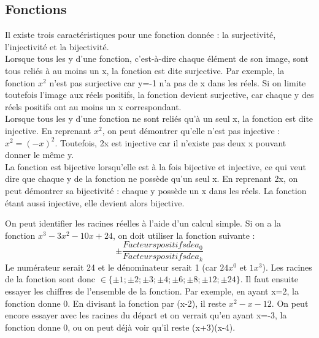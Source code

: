 \documentclass[10pt, french]{article}
\begin{document}
\begin{multicols*}{2}
\section{Fonctions}

\begin{definitionNOHFILL}
Il existe trois caractéristiques pour une fonction donnée : la surjectivité, l'injectivité et la bijectivité.\\

Lorsque tous les y d'une fonction, c'est-à-dire chaque élément de son image, sont tous reliés à au moins un x, la fonction est dite surjective. Par exemple, la fonction $x^{2}$ n'est pas surjective car y=-1 n'a pas de x dans les réels. Si on limite toutefois l'image aux réels positifs, la fonction devient surjective, car chaque y des réels positifs ont au moins un x correspondant.\\

Lorsque tous les y d'une fonction ne sont reliés qu'à un seul x, la fonction est dite injective. En reprenant $x^{2}$, on peut démontrer qu'elle n'est pas injective : $x^{2}=(-x)^{2}$. Toutefois, 2x est injective car il n'existe pas deux x pouvant donner le même y.\\

La fonction est bijective lorsqu'elle est à la fois bijective et injective, ce qui veut dire que chaque y de la fonction ne possède qu'un seul x. En reprenant 2x, on peut démontrer sa bijectivité : chaque y possède un x dans les réels. La fonction étant aussi injective, elle devient alors bijective.
\end{definitionNOHFILL}

\begin{definitionNOHFILL}
On peut identifier les racines réelles à l'aide d'un calcul simple. Si on a la fonction $ x^{3}-3x^{2}-10x+24 $, on doit utiliser la fonction suivante : \\
  \begin{equation*}
			\pm \frac{Facteurs positifs de a_{0}}{Facteurs positifs de a_{k}}
	\end{equation*}
Le numérateur serait 24 et le dénominateur serait 1 (car $24x^{0}$ et $1x^{3}$). Les racines de la fonction sont donc $\in \{ {\pm 1; \pm 2; \pm 3; \pm 4; \pm 6; \pm 8; \pm 12; \pm 24} \}$. Il faut ensuite essayer les chiffres de l'ensemble de la fonction. Par exemple, en ayant x=2, la fonction donne 0. En divisant la fonction par (x-2), il reste $x^{2}-x-12$. On peut encore essayer avec les racines du départ et on verrait qu'en ayant x=-3, la fonction donne 0, ou on peut déjà voir qu'il reste (x+3)(x-4).
\end{definitionNOHFILL}


\end{multicols*}
\end{document}
